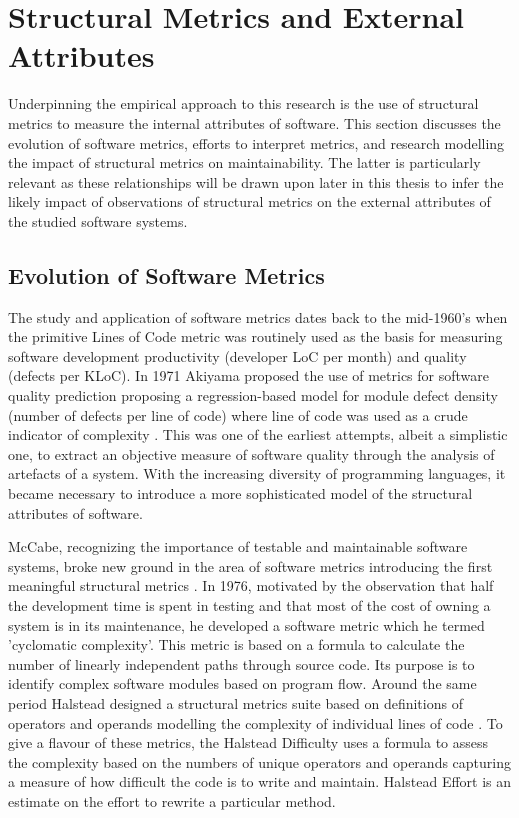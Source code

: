 \section{Structural Metrics and External Attributes} %
Underpinning the empirical approach to this research is the use of structural metrics to measure the internal attributes of software. This section discusses the evolution of software metrics, efforts to interpret metrics, and research modelling the impact of structural metrics on maintainability. The latter is particularly relevant as these relationships will be drawn upon later in this thesis to infer the likely impact of observations of structural metrics on the external attributes of the studied software systems.

\subsection{Evolution of Software Metrics}
The study and application of software metrics dates back to the mid-1960's when the primitive Lines of Code metric was routinely used as the basis for measuring software development productivity (developer LoC per month) and quality (defects per KLoC). In 1971 Akiyama proposed the use of metrics for software quality prediction proposing a regression-based model for module defect density (number of defects per line of code) where line of code was used as a crude indicator of complexity \citep{akiyama1971example}. This was one of the earliest attempts, albeit a simplistic one, to extract an objective measure of software quality through the analysis of artefacts of a system. With the increasing diversity of programming languages, it became necessary to introduce a more sophisticated model of the structural attributes of software. 

McCabe, recognizing the importance of testable and maintainable software systems, broke new ground in the area of software metrics introducing the first meaningful structural metrics \citep{mccabe1976complexity}. In 1976, motivated by the observation that half the development time is spent in testing and that most of the cost of owning a system is in its maintenance, he developed a software metric which he termed 'cyclomatic complexity'. This metric is based on a formula to calculate the number of linearly independent paths through source code. Its purpose is to identify complex software modules based on program flow. Around the same period Halstead designed a structural metrics suite based on definitions of operators and operands modelling the complexity of individual lines of code \citep{halstead1977elements}. To give a flavour of these metrics, the Halstead Difficulty uses a formula to assess the complexity based on the numbers of unique operators and operands capturing a measure of how difficult the code is to write and maintain. Halstead Effort is an estimate on the effort to rewrite a particular method.

